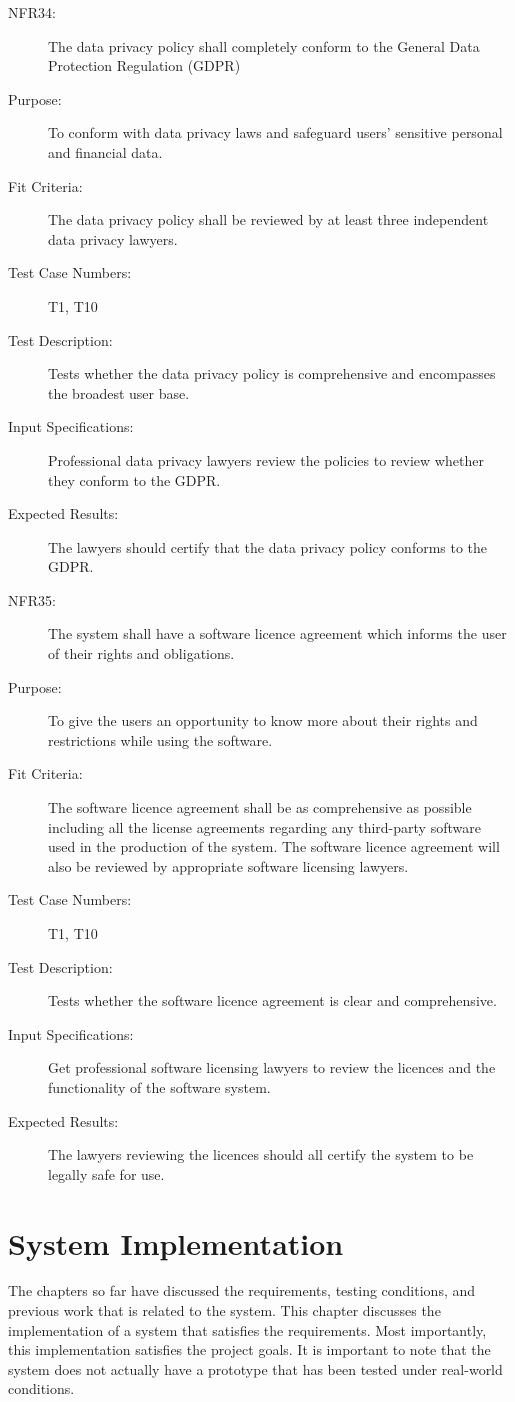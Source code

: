 \documentclass[a4paper,twoside,phd]{BYUPhys}
\begin{document}
\begin{description}
\item[NFR34:] The data privacy policy shall completely conform to the General Data Protection Regulation (GDPR)
\item[Purpose:] To conform with data privacy laws and safeguard users' sensitive personal and financial data.
\item[Fit Criteria:] The data privacy policy shall be reviewed by at least three independent data privacy lawyers. 
\item[Test Case Numbers:] T1, T10
\item[Test Description:] Tests whether the data privacy policy is comprehensive and encompasses the broadest user base.
\item[Input Specifications:] Professional data privacy lawyers review the policies to review whether they conform to the GDPR.
\item[Expected Results:] The lawyers should certify that the data privacy policy conforms to the GDPR.

\item[NFR35:] The system shall have a software licence agreement which informs the user of their rights and obligations.
\item[Purpose:] To give the users an opportunity to know more about their rights and restrictions while using the software.
\item[Fit Criteria:] The software licence agreement shall be as comprehensive as possible including all the license agreements regarding any third-party software used in the production of the system. The software licence agreement will also be reviewed by appropriate software licensing lawyers.
\item[Test Case Numbers:] T1, T10
\item[Test Description:] Tests whether the software licence agreement is clear and comprehensive.
\item[Input Specifications:] Get professional software licensing lawyers to review the licences and the functionality of the software system.
\item[Expected Results:] The lawyers reviewing the licences should all certify the system to be legally safe for use.
\end{description}

\chapter{System Implementation}
\label{chap:System Implementation}
The chapters so far have discussed the requirements, testing conditions, and previous work that is related to the system. This chapter discusses the implementation of a system that satisfies the requirements. Most importantly, this implementation satisfies the project goals. It is important to note that the system does not actually have a prototype that has been tested under real-world conditions.
\end{document}
